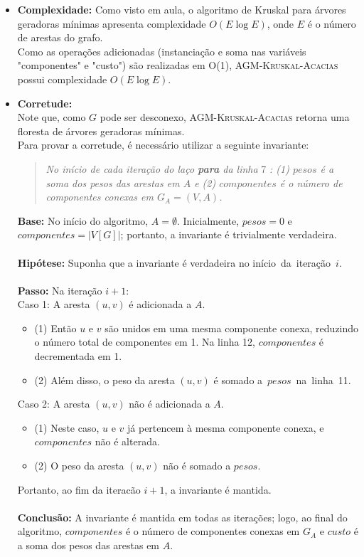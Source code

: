 \documentclass[
    12pt,
    a4paper,
    brazil,
    english
]{article}
\begin{document}
    \begin{itemize}
        \item \textbf{Complexidade:} Como visto em aula, o algoritmo de Kruskal para árvores geradoras mínimas apresenta complexidade $O(E \log E)$, onde $E$ é o número de arestas do grafo. \\
        Como as operações adicionadas (instanciação e soma nas variáveis "componentes" e "custo") são realizadas em O(1), \textsc{AGM-Kruskal-Acacias} possui complexidade $O(E \log E)$.
        \item \textbf{Corretude:} \\
        Note que, como $G$ pode ser desconexo, \textsc{AGM-Kruskal-Acacias} retorna uma floresta de árvores geradoras mínimas. \\
        Para provar a corretude, é necessário utilizar a seguinte invariante:
        \begin{quote}
            \textit{No início de cada iteração do laço \textbf{para} da linha} 7 \textit{: (1) $pesos$ é a soma dos pesos das arestas em $A$ e (2) $componentes$ é o número de componentes conexas em $G_A = (V, A)$.}
        \end{quote}
        \textbf{Base:} No início do algoritmo, $A = \emptyset$. Inicialmente, $pesos = 0$ e $componentes = |V[G]|$; portanto, a invariante é trivialmente verdadeira. \\\\
        \textbf{Hipótese:} Suponha que a invariante é verdadeira no \mbox{início~da~iteração~$i$}. \\\\
        \textbf{Passo:} Na iteração $i + 1$: \\
    Caso 1: A aresta $(u, v)$ é adicionada a $A$.
    \begin{itemize}
        \item (1) Então $u$ e $v$ são unidos em uma mesma componente conexa, reduzindo o número total de componentes em 1. Na linha 12, $componentes$ é decrementada em 1.
        \item (2) Além disso, o peso da aresta $(u, v)$ é somado \mbox{a $pesos$ na linha 11}.
    \end{itemize}
    Caso 2: A aresta $(u, v)$ não é adicionada a $A$.
    \begin{itemize}
        \item (1) Neste caso, $u$ e $v$ já pertencem à mesma componente conexa, e $componentes$ não é alterada.
        \item (2) O peso da aresta $(u, v)$ não é somado a $pesos$.
    \end{itemize}
    Portanto, ao fim da iteracão $i + 1$, a invariante é mantida. \\\\
    \textbf{Conclusão:} A invariante é mantida em todas as iterações; logo, ao final do algoritmo, $componentes$ é o número de componentes conexas em $G_A$ e $custo$ é a soma dos pesos das arestas em $A$.
\end{itemize}
 
\end{document}
